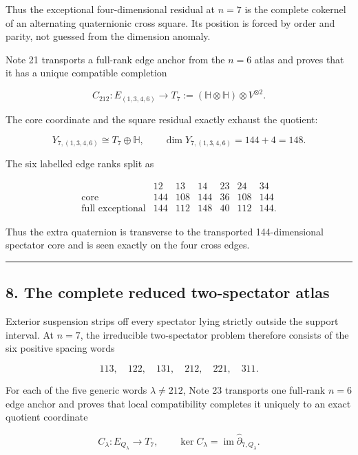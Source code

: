 \documentclass[
  11pt,
  a4paper,
]{article}
\begin{document}
Thus the exceptional four-dimensional residual at \(n=7\) is the
complete cokernel of an alternating quaternionic cross square. Its
position is forced by order and parity, not guessed from the dimension
anomaly.

Note 21 transports a full-rank edge anchor from the \(n=6\) atlas and
proves that it has a unique compatible completion

\[
C_{212}:E_{(1,3,4,6)}\longrightarrow
T_7:=(\mathbb H\otimes\mathbb H)\otimes V^{\otimes2}.
\tag{7.6}
\]

The core coordinate and the square residual exactly exhaust the
quotient:

\[
\boxed{
Y_{7,(1,3,4,6)}
\cong T_7\oplus\mathbb H,
\qquad
\dim Y_{7,(1,3,4,6)}=144+4=148.
}
\tag{7.7}
\]

The six labelled edge ranks split as

\[
\begin{array}{c|rrrrrr}
&12&13&14&23&24&34\\ \hline
\text{core}&144&108&144&36&108&144\\
\text{full exceptional}&144&112&148&40&112&144.
\end{array}
\tag{7.8}
\]

Thus the extra quaternion is transverse to the transported
144-dimensional spectator core and is seen exactly on the four cross
edges.

\begin{center}\rule{0.5\linewidth}{0.5pt}\end{center}

\hypertarget{the-complete-reduced-two-spectator-atlas}{%
\subsection{8. The complete reduced two-spectator
atlas}\label{the-complete-reduced-two-spectator-atlas}}

Exterior suspension strips off every spectator lying strictly outside
the support interval. At \(n=7\), the irreducible two-spectator problem
therefore consists of the six positive spacing words

\[
113,\quad122,\quad131,\quad212,\quad221,\quad311.
\tag{8.1}
\]

For each of the five generic words \(\lambda\ne212\), Note 23 transports
one full-rank \(n=6\) edge anchor and proves that local compatibility
completes it uniquely to an exact quotient coordinate

\[
C_\lambda:E_{Q_\lambda}\longrightarrow T_7,
\qquad
\ker C_\lambda=\operatorname{im}\widehat\partial_{7,Q_\lambda}.
\tag{8.2}
\]
\end{document}
